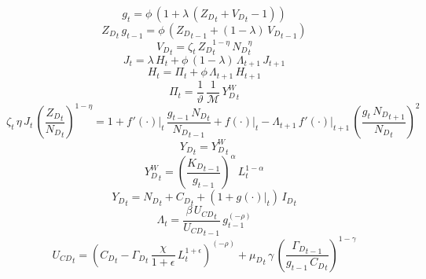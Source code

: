 \documentclass[10pt,a4paper]{article}
\begin{document}
\footnotesize
\begin{dmath}
{g}_{t}=\phi\, \left(1+\lambda\, \left({Z_D}_{t}+{V_D}_{t}-1\right)\right)
\end{dmath}
\begin{dmath}
{Z_D}_{t}\, {g}_{t-1}=\phi\, \left({Z_D}_{t-1}+\left(1-\lambda\right)\, {V_D}_{t-1}\right)
\end{dmath}
\begin{dmath}
{V_D}_{t}={\zeta}_{t}\, {Z_D}_{t}^{1-\eta}\, {N_D}_{t}^{\eta}
\end{dmath}
\begin{dmath}
{J}_{t}=\lambda\, {H}_{t}+\phi\, \left(1-\lambda\right)\, {\Lambda}_{t+1}\, {J}_{t+1}
\end{dmath}
\begin{dmath}
{H}_{t}={\Pi}_{t}+\phi\, {\Lambda}_{t+1}\, {H}_{t+1}
\end{dmath}
\begin{dmath}
{\Pi}_{t}=\frac{1}{\vartheta}\, \frac{1}{\mathcal{M}}\, {Y^W_D}_{t}
\end{dmath}
\begin{dmath}
{\zeta}_{t}\, \eta\, {J}_{t}\, \left(\frac{{Z_D}_{t}}{{N_D}_{t}}\right)^{1-\eta}=1+{\left.       f^‎{\prime}\left( \cdot \right)   \right|}_{t}\, \frac{{g}_{t-1}\, {N_D}_{t}}{{N_D}_{t-1}}+{\left.       f\left( \cdot \right)            \right|}_{t}-{\Lambda}_{t+1}\, {\left.       f^‎{\prime}\left( \cdot \right)   \right|}_{t+1}\, \left(\frac{{g}_{t}\, {N_D}_{t+1}}{{N_D}_{t}}\right)^{2}
\end{dmath}
\begin{dmath}
{Y_D}_{t}={Y^W_D}_{t}
\end{dmath}
\begin{dmath}
{Y^W_D}_{t}=\left(\frac{{K_D}_{t-1}}{{g}_{t-1}}\right)^{\alpha}\, {L}_{t}^{1-\alpha}
\end{dmath}
\begin{dmath}
{Y_D}_{t}={N_D}_{t}+{C_D}_{t}+\left(1+{\left.       g\left( \cdot \right)            \right|}_{t}\right)\, {I_D}_{t}
\end{dmath}
\begin{dmath}
{\Lambda}_{t}=\frac{\beta\, {U_{CD}}_{t}}{{U_{CD}}_{t-1}}\, {g}_{t-1}^{\left(-\rho\right)}
\end{dmath}
\begin{dmath}
{U_{CD}}_{t}=\left({C_D}_{t}-{\Gamma_D}_{t}\, \frac{\chi}{1+\epsilon}\, {L}_{t}^{1+\epsilon}\right)^{\left(-\rho\right)}+{{\mu}_{D}}_{t}\, \gamma\, \left(\frac{{\Gamma_D}_{t-1}}{{g}_{t-1}\, {C_D}_{t}}\right)^{1-\gamma}
\end{dmath}
\end{document}
